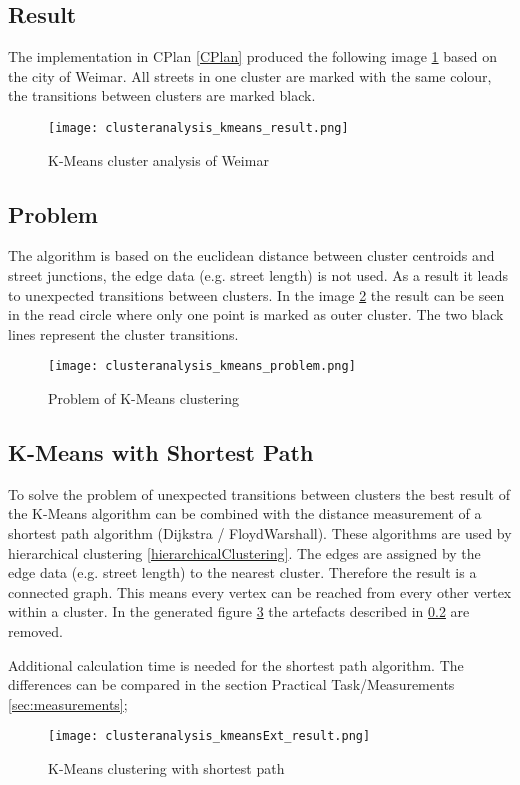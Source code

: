 \subsection{Result}
The implementation in CPlan \ref{CPlan} produced the following image \ref{fig:KmeansGenerated} based on the city of Weimar. All streets in one cluster are marked with the same colour, the transitions between clusters are marked black.
\begin{figure}[!h]
    \centering
    \texttt{[image: clusteranalysis\_kmeans\_result.png]}
    \caption{K-Means cluster analysis of Weimar\label{fig:KmeansGenerated}}
\end{figure}

\subsection{Problem} \label{kmenasProblem}
The algorithm is based on the euclidean distance between cluster centroids and street junctions, the edge data (e.g. street length) is not used. As a result it leads to unexpected transitions between clusters. In the image \ref{fig:KmeansProblem} the result can be seen in the read circle where only one point is marked as outer cluster. The two black lines represent the cluster transitions.
\begin{figure}[!h]
    \centering
    \texttt{[image: clusteranalysis\_kmeans\_problem.png]}
    \caption{Problem of K-Means clustering\label{fig:KmeansProblem}}
\end{figure}

\subsection{K-Means with Shortest Path}
To solve the problem of unexpected transitions between clusters the best result of the K-Means algorithm can be combined with the distance measurement of a shortest path algorithm (Dijkstra / FloydWarshall). These algorithms are used by hierarchical clustering \ref{hierarchicalClustering}. The edges are assigned by the edge data (e.g. street length) to the nearest cluster. Therefore the result is a connected graph. This means every vertex can be reached from every other vertex within a cluster. In the generated figure \ref{fig:Kmeansshortestp} the artefacts described in \ref{kmenasProblem} are removed.

Additional calculation time is needed for the shortest path algorithm. The differences can be compared in the section Practical Task/Measurements \ref{sec:measurements};

\begin{figure}[!h]
    \centering
    \texttt{[image: clusteranalysis\_kmeansExt\_result.png]}
    \caption{K-Means clustering with shortest path\label{fig:Kmeansshortestp}}
\end{figure}
